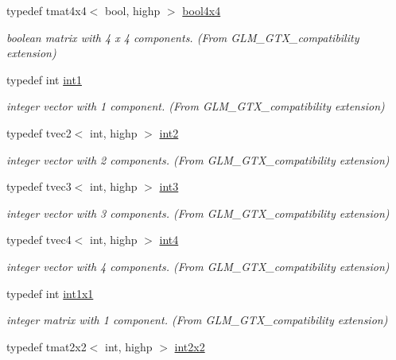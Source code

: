 \begin{DoxyCompactItemize}
typedef tmat4x4$<$ bool, highp $>$ \hyperlink{group__gtx__compatibility_gafd4a5a69fab4d76f91ee75684f3bf2f1}{bool4x4}
\begin{DoxyCompactList}\small\item\em boolean matrix with 4 x 4 components. (From G\+L\+M\+\_\+\+G\+T\+X\+\_\+compatibility extension) \end{DoxyCompactList}\item 
typedef int \hyperlink{group__gtx__compatibility_gaba41d7803e4b24c17656d74377b88286}{int1}
\begin{DoxyCompactList}\small\item\em integer vector with 1 component. (From G\+L\+M\+\_\+\+G\+T\+X\+\_\+compatibility extension) \end{DoxyCompactList}\item 
typedef tvec2$<$ int, highp $>$ \hyperlink{group__gtx__compatibility_ga89f98d125d3e73b50e34bc35d93796f1}{int2}
\begin{DoxyCompactList}\small\item\em integer vector with 2 components. (From G\+L\+M\+\_\+\+G\+T\+X\+\_\+compatibility extension) \end{DoxyCompactList}\item 
typedef tvec3$<$ int, highp $>$ \hyperlink{group__gtx__compatibility_gafc297ec294f5aa0360a634656c20e1d0}{int3}
\begin{DoxyCompactList}\small\item\em integer vector with 3 components. (From G\+L\+M\+\_\+\+G\+T\+X\+\_\+compatibility extension) \end{DoxyCompactList}\item 
typedef tvec4$<$ int, highp $>$ \hyperlink{group__gtx__compatibility_gab93125af983ab22b9647b64770b26aa1}{int4}
\begin{DoxyCompactList}\small\item\em integer vector with 4 components. (From G\+L\+M\+\_\+\+G\+T\+X\+\_\+compatibility extension) \end{DoxyCompactList}\item 
typedef int \hyperlink{group__gtx__compatibility_ga09016a637a3cd093c22e6188080ac750}{int1x1}
\begin{DoxyCompactList}\small\item\em integer matrix with 1 component. (From G\+L\+M\+\_\+\+G\+T\+X\+\_\+compatibility extension) \end{DoxyCompactList}\item 
typedef tmat2x2$<$ int, highp $>$ \hyperlink{group__gtx__compatibility_ga5f407f808d8fa5b771ea7417cedc4868}{int2x2}

\end{DoxyCompactItemize}
